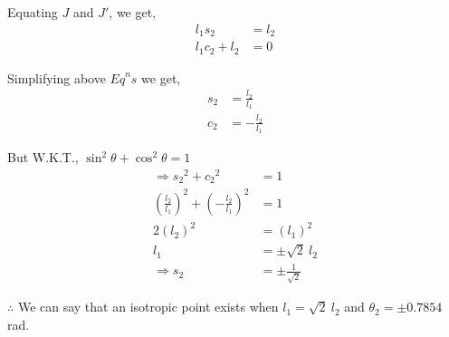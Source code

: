 \documentclass[a4paper]{article}
\begin{document}
\begin{qalist}
			Equating $J$ and $J'$, we get, 
			\begin{align}
				{l}_{1}{s}_{2} &= {l}_{2} \\
				{l}_{1}{c}_{2}+{l}_{2} &= 0
			\end{align}
			
			Simplifying above ${Eq}^{n}s$ we get, 
			\begin{align}
				{s}_{2} &= \frac{{l}_{2}}{{l}_{1}} \\
				{c}_{2} &= -\frac{{l}_{2}}{{l}_{1}}
			\end{align}
			
			But W.K.T., $ {\sin}^{2}\theta + {\cos}^{2}\theta = 1$
			\begin{align}
				\Rightarrow {{s}_{2}}^{2} + {{c}_{2}}^{2} &= 1 \\
				{\left(\frac{{l}_{2}}{{l}_{1}}\right)}^{2} + {\left(-\frac{{l}_{2}}{{l}_{1}}\right)}^{2} &= 1 \\
				2{({l}_{2})}^{2} &= {({l}_{1})}^{2} \\
				{l}_{1} &= \pm \sqrt{2}~{l}_{2} \\
				\Rightarrow {s}_{2} &= \pm \frac{1}{\sqrt{2}} 
			\end{align}
			
			$\therefore$ We can say that an isotropic point exists when ${l}_{1} = \sqrt{2}~{l}_{2}$ and ${\theta}_{2} = \pm 0.7854$ rad.
		
		\newpage
		

\end{qalist}
\end{document}

